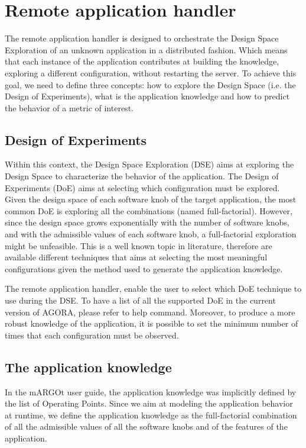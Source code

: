 \section{Remote application handler}

The remote application handler is designed to orchestrate the Design Space Exploration of an unknown application in a distributed fashion.
Which means that each instance of the application contributes at building the knowledge, exploring a different configuration, without restarting the server.
To achieve this goal, we need to define three concepts: how to explore the Design Space (i.e. the Design of Experiments), what is the application knowledge and how to predict the behavior of a metric of interest. 


\subsection{Design of Experiments}

Within this context, the Design Space Exploration (DSE) aims at exploring the Design Space to characterize the behavior of the application.
The Design of Experiments (DoE) aims at selecting which configuration must be explored.
Given the design space of each software knob of the target application, the most common DoE is exploring all the combinations (named full-factorial).
However, since the design space grows exponentially with the number of software knobs, and with the admissible values of each software knob, a full-factorial exploration might be unfeasible.
This is a well known topic in literature, therefore are available different techniques that aims at selecting the most meaningful configurations given the method used to generate the application knowledge.

The remote application handler, enable the user to select which DoE technique to use during the DSE.
To have a list of all the supported DoE in the current version of AGORA, please refer to help command.
Moreover, to produce a more robust knowledge of the application, it is possible to set the minimum number of times that each configuration must be observed.


\subsection{The application knowledge}

In the mARGOt user guide, the application knowledge was implicitly defined by the list of Operating Points.
Since we aim at modeling the application behavior at runtime, we define the application knowledge as the full-factorial combination of all the admissible values of all the software knobs and of the features of the application.

